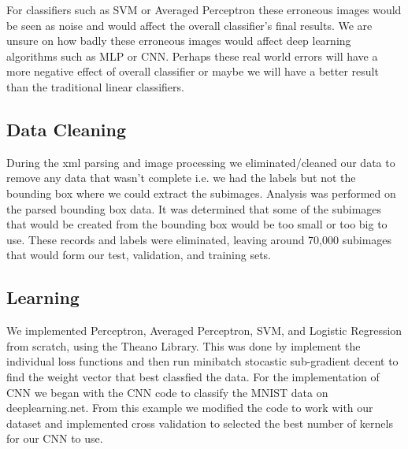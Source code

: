 For classifiers such as SVM or Averaged Perceptron these erroneous images would be seen as noise and would affect the overall classifier's final results.  We are unsure on how badly these erroneous images would affect deep learning algorithms such as MLP or CNN.   Perhaps these real world errors will have a more negative effect of overall classifier or maybe we will have a better result than the traditional linear classifiers.

\subsection{Data Cleaning}
During the xml parsing and image processing we eliminated/cleaned our data to remove any data that wasn’t complete i.e. we had the labels but not the bounding box where we could extract the subimages. Analysis was performed on the parsed bounding box data.  It was determined that some of the subimages that would be created from the bounding box would be too small or too big to use.  These records and labels were eliminated, leaving around 70,000 subimages that would form our  test, validation, and training sets.  

\subsection{Learning}
We implemented Perceptron, Averaged Perceptron, SVM, and Logistic Regression from scratch, using the Theano Library.  This was done by implement the individual loss functions and then run minibatch stocastic sub-gradient decent to find the weight vector that best classfied the data.  For the implementation of CNN we began with the CNN code to classify the MNIST data on deeplearning.net.  From this example we modified the code to work with our dataset and implemented cross validation to selected the best number of kernels for our CNN to use.


